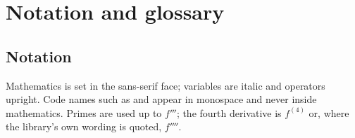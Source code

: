 \chapter*{Notation and glossary}

\section*{Notation}

Mathematics is set in the sans-serif face; variables are italic and operators upright. Code names such as
 and  appear in monospace and never inside mathematics. Primes are used up to
$f'''$; the fourth derivative is $f^{(4)}$ or, where the library's own wording is quoted, $f''''$.

